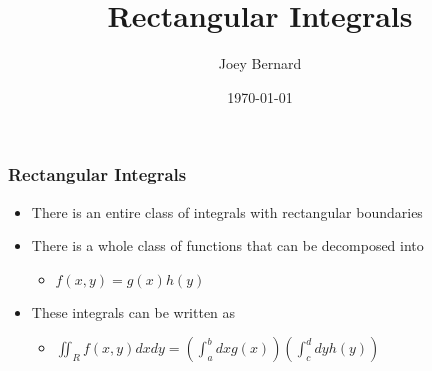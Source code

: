 \documentclass{beamer}
\title{Rectangular Integrals}
\author{Joey Bernard}
\institute{University of New Brunswick}
\date{\today}
\begin{document}
\begin{frame}
  \titlepage
\end{frame}

\begin{frame}
  \frametitle{Rectangular Integrals}
  \begin{itemize}
  \item There is an entire class of integrals with rectangular boundaries
  \item There is a whole class of functions that can be decomposed into
    \begin{itemize}
    \item $f(x,y) = g(x)h(y)$
    \end{itemize}
  \item These integrals can be written as
    \begin{itemize}
    \item $\iint_R f(x,y) dx dy = (\int^b_a dx g(x)) (\int^d_c dy h(y))$
    \end{itemize}
  \end{itemize}
\end{frame}
\end{document}
